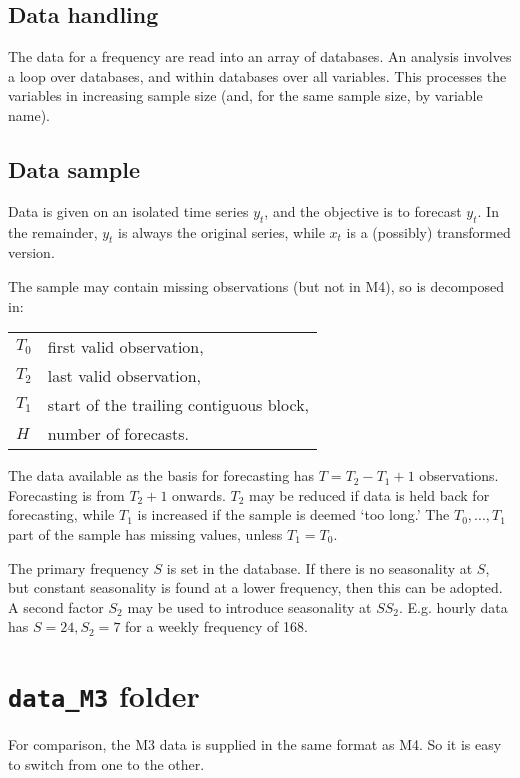 \documentclass[11pt,a4paper]{article}
\begin{document}
\subsection{Data handling}
\label{se:handling}

The data for a frequency are read into an array of databases. An analysis involves a loop over databases, and
within databases over all variables. This processes the variables in increasing sample size (and, for the same sample size,
by variable name).

\subsection{Data sample}

Data is given on an isolated time series $y_t$, and the objective is to forecast $y_t$.
In the remainder, $y_t$ is always the original series, while $x_t$ is a (possibly) transformed version.

The sample may contain missing observations (but not in M4), so is decomposed in:
\begin{center}
\begin{tabular}{ll}
$T_0$& first valid observation,                  \\
$T_2$& last valid observation,                   \\
$T_1$& start of the trailing contiguous block,   \\
$H$& number of forecasts.
\end{tabular}
\end{center}

The data available as the basis for forecasting has $T=T_2-T_1+1$ observations. Forecasting is from $T_2+1$ onwards.
$T_2$ may be reduced if data is held back for forecasting, while $T_1$ is increased if the sample is deemed `too long.'
The $T_0,...,T_1$ part of the sample has missing values, unless $T_1=T_0$.

The primary frequency $S$ is set in the database. If there is no seasonality at $S$, but constant
seasonality is found at a lower frequency, then this can be adopted. A second factor $S_2$ may be used
to introduce seasonality at $SS_2$. E.g. hourly data has $S=24, S_2 = 7$ for a weekly frequency of 168.

\section{\texttt{data\_M3} folder}

For comparison, the M3 data is supplied in the same format as M4. So it is easy to switch from one to the other.
\end{document}
